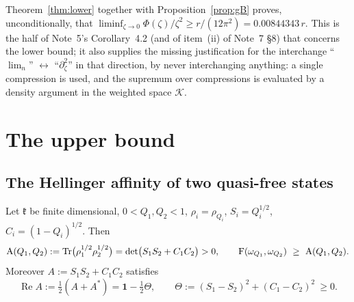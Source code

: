 \documentclass[11pt]{article}
\newcommand{\one}{\mathbf 1}
\newcommand{\Hell}{\operatorname{A}}
\theoremstyle{definition}\newtheorem{problem}[theorem]{Problem}
\begin{document}
\lproof
{}

\begin{verdictok}
Theorem~\ref{thm:lower} together with Proposition~\ref{prop:gB} proves, unconditionally, that
\(\liminf_{\zeta\to0}\Phi(\zeta)/\zeta^2\ge r/(12\pi^2)=0.00844343\,r\).  This is the half of
Note~5's Corollary~4.2 (and of item~(ii) of Note~7 \S8) that concerns the lower bound; it also
supplies the missing justification for the interchange ``\(\lim_n\)'' \(\leftrightarrow\)
``\(\partial_\zeta^2\)'' in that direction, by never interchanging anything: a single compression is
used, and the supremum over compressions is evaluated by a density argument in the weighted space
\(\mathcal K\).
\end{verdictok}

\section{The upper bound}\label{sec:upper}

\subsection{The Hellinger affinity of two quasi-free states}

\begin{lemma}\label{lem:hell}
Let \(\mathfrak k\) be finite dimensional, \(0<Q_1,Q_2<1\), \(\rho_i=\rho_{Q_i}\),
\(S_i=Q_i^{1/2}\), \(C_i=(1-Q_i)^{1/2}\).  Then
\begin{equation}\label{eq:hellclosed}
 \Hell(Q_1,Q_2):=\Tr\bigl(\rho_1^{1/2}\rho_2^{1/2}\bigr)
 =\det\bigl(S_1S_2+C_1C_2\bigr)>0,
 \qquad
 \Fid(\omega_{Q_1},\omega_{Q_2})\ \ge\ \Hell(Q_1,Q_2).
\end{equation}
Moreover \(A:=S_1S_2+C_1C_2\) satisfies
\begin{equation}\label{eq:ReA}
 \operatorname{Re}A:=\tfrac12(A+A^*)=\one-\tfrac12\Theta,\qquad
 \Theta:=(S_1-S_2)^2+(C_1-C_2)^2\ \ge0 .
\end{equation}
\end{lemma}
\end{document}
